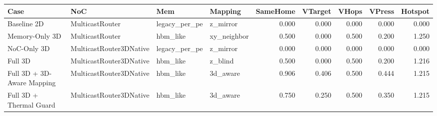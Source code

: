 \begin{tabular}{l l l l r r r r r}
\hline
Case & NoC & Mem & Mapping & SameHome & VTarget & VHops & VPress & Hotspot \\
\hline
Baseline 2D & MulticastRouter & legacy\_per\_pe & z\_mirror & 0.000 & 0.000 & 0.000 & 0.000 & 0.000 \\
Memory-Only 3D & MulticastRouter & hbm\_like & xy\_neighbor & 0.500 & 0.000 & 0.500 & 0.200 & 1.250 \\
NoC-Only 3D & MulticastRouter3DNative & legacy\_per\_pe & z\_mirror & 0.000 & 0.000 & 0.000 & 0.000 & 0.000 \\
Full 3D & MulticastRouter3DNative & hbm\_like & z\_blind & 0.500 & 0.000 & 0.500 & 0.200 & 1.216 \\
Full 3D + 3D-Aware Mapping & MulticastRouter3DNative & hbm\_like & 3d\_aware & 0.906 & 0.406 & 0.500 & 0.444 & 1.215 \\
Full 3D + Thermal Guard & MulticastRouter3DNative & hbm\_like & 3d\_aware & 0.750 & 0.250 & 0.500 & 0.350 & 1.215 \\
\hline
\end{tabular}
